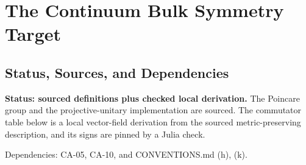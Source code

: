 
\section{The Continuum Bulk Symmetry Target}
\label{sec:continuum-bulk-symmetry-target}

\subsection{Status, Sources, and Dependencies}

\textbf{Status: sourced definitions plus checked local derivation.}  The
Poincare group and the projective-unitary implementation are sourced.  The
commutator table below is a local vector-field derivation from the sourced
metric-preserving description, and its signs are pinned by a Julia check.

Dependencies: CA-05, CA-10, and CONVENTIONS.md (h), (k).


